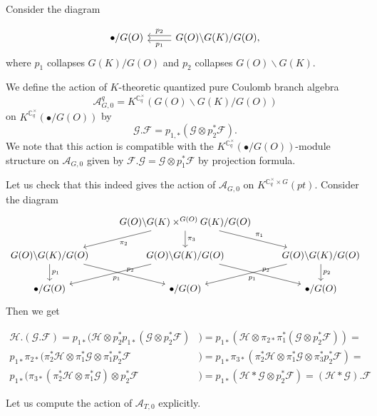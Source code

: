 \documentclass{article}
\renewcommand{\C}{\mathbb{C}}
\newcommand{\mc}[1]{\mathcal{#1}}
\begin{document}
Consider the diagram

\[
\begin{tikzcd}
\bullet/G(O) & \ar[l,"p_1",shift left]\ar[l,"p_2"', shift right] G(O)\backslash G(K)/G(O),
\end{tikzcd}
\]
where $p_1$ collapses $G(K)/G(O)$ and $p_2$ collapses $G(O)\backslash G(K)$.

We define the action of $K$-theoretic quantized pure Coulomb branch algebra \[\mc{A}_{G,0}^q=K^{\C^{\times}_q}(G(O)\backslash G(K)/G(O))\] on $K^{\C^{\times}_q}(\bullet/G(O))$ by \[\mc{G}.\mc{F}=p_{1,*}(\mc{G}\otimes p_2^*\mc{F}).\] We note that this action is compatible with the $K^{\C^{\times}_q}(\bullet/G(O))$-module structure on $\mc{A}_{G,0}$ given by $\mc{F}.\mc{G}=\mc{G}\otimes p_1^*\mc{F}$ by projection formula.

Let us check that this indeed gives the action of $\mc{A}_{G,0}$ on $K^{\C^{\times}_q\times G}(pt)$. Consider the diagram
\[
\begin{tikzcd}
& G(O)\backslash G(K)\times^{G(O)}G(K)/G(O)\ar[dl,"\pi_2"]\ar[d,"\pi_3"]\ar[dr,"\pi_1"] & \\
G(O)\backslash G(K)/G(O) \ar[d,"p_1"]\ar[dr,"p_2"] & G(O)\backslash G(K)/G(O) \ar[dl,"p_1"]\ar[dr,"p_2"] & G(O)\backslash G(K)/G(O)\ar[dl,"p_1"]\ar[d,"p_2"]\\
\bullet/G(O) & \bullet/G(O) & \bullet/G(O)
\end{tikzcd}
\]
Then we get

\begin{align*}
\mc{H}.(\mc{G}.\mc{F})=p_{1*}(\mc{H}\otimes p_2^*p_{1*}(\mc{G}\otimes p_2^*\mc{F})&)= p_{1*}(\mc{H}\otimes \pi_{2*}\pi_1^*(\mc{G}\otimes p_2^*\mc{F}))=\\
p_{1*}\pi_{2*}(\pi_2^*\mc{H}\otimes \pi_1^*\mc{G}\otimes \pi_1^*p_2^*\mc{F}&)= p_{1*}\pi_{3*}(\pi_2^*\mc{H}\otimes \pi_1^*\mc{G}\otimes \pi_3^*p_2^*\mc{F})=\\
p_{1*}(\pi_{3*}(\pi_2^*\mc{H}\otimes \pi_1^*\mc{G})\otimes p_2^*\mc{F}&)= p_{1*}(\mc{H}*\mc{G}\otimes p_2^*\mc{F})=(\mc{H}*\mc{G}).\mc{F}
\end{align*}

Let us compute the action of $\mc{A}_{T,0}$ explicitly.
\end{document}
